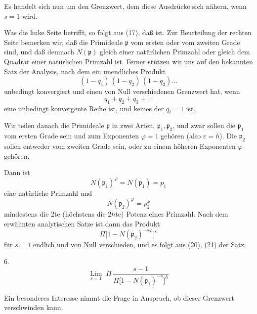 
Es handelt sich nun um den Grenzwert, dem diese Ausdrücke sich nähern, wenn $s=1$ wird.

Was die linke Seite betrifft, so folgt aus (17), daß
ist. Zur Beurteilung der rechten Seite bemerken wir, daß die Primideale $\mathfrak{p}$ vom ersten oder vom zweiten Grade sind, und daß demnach $N(\mathfrak{p})$ gleich einer natürlichen Primzahl oder gleich dem Quadrat einer natürlichen Primzahl ist. Ferner stützen wir uns auf den bekannten Satz der Analysis, nach dem ein unendliches Produkt
\[
(1-q_1)\,(1-q_2)\,(1-q_3)\ldots
\]
unbedingt konvergiert und einen von Null verschiedenen Grenzwert hat, wenn
\[
q_1+q_2+q_3+\cdots
\]
eine unbedingt konvergente Reihe ist, und keines der $q_i=1$ ist.

Wir teilen danach die Primideale $\mathfrak{p}$ in zwei Arten, $\mathfrak{p}_1, \mathfrak{p}_2$, und zwar sollen die $\mathfrak{p}_1$ vom ersten Grade sein und zum Exponenten $\varphi=1$ gehören (also $\varepsilon=h$). Die $\mathfrak{p}_2$ sollen entweder vom zweiten Grade sein, oder zu einem höheren Exponenten $\varphi$ gehören. 

Dann ist
\[
N(\mathfrak{p}_1)^{\varphi} = N(\mathfrak{p}_1) = p_1
\]
eine natürliche Primzahl und
\[
N(\mathfrak{p}_2)^{\varphi} = p_2^{k}
\]
mindestens die 2te (höchstens die $2h$te) Potenz einer Primzahl. Nach dem erwähnten analytischen Satze ist dann das Produkt
\[
\Pi\bigl[1-N(\mathfrak{p}_2)^{-s\varphi}\bigr]^{\varepsilon}
\]
für $s=1$ endlich und von Null verschieden, und es folgt aus (20), (21) der Satz:

6. 
\[
\mathop{\mathrm{Lim}}\limits_{s=1} \; \Pi\,\dfrac{s-1}{\Pi\bigl[1-N(\mathfrak{p}_1)^{-s}\bigr]^{h}}
\]

Ein besonderes Interesse nimmt die Frage in Anspruch, ob dieser Grenzwert verschwinden kann.
